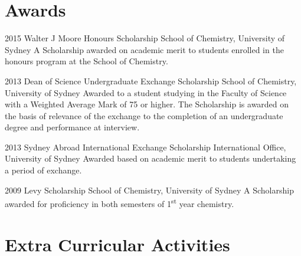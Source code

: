 \documentclass{friggeri-cv} %
\begin{document}

\section{Awards}

\begin{entrylist}


\entry
{2015}
{Walter J Moore Honours Scholarship}
{School of Chemistry, University of Sydney}
{A Scholarship awarded on academic merit to students enrolled in the honours program at the School of Chemistry.}

\entry
{2013}
{Dean of Science Undergraduate Exchange Scholarship}
{School of Chemistry, University of Sydney}
{Awarded to a student studying in the Faculty of Science with a Weighted Average Mark of 75 or higher. The Scholarship is awarded on the basis of relevance of the exchange to the completion of an undergraduate degree and performance at interview.}

\entry
{2013}
{Sydney Abroad International Exchange Scholarship}
{International Office, University of Sydney}
{Awarded based on academic merit to students undertaking a period of exchange.}

\entry
{2009}
{Levy Scholarship}
{School of Chemistry, University of Sydney}
{A Scholarship awarded for proficiency in both semesters of 1\textsuperscript{st} year chemistry.}


\end{entrylist}


\section{Extra Curricular Activities}
\end{document}
